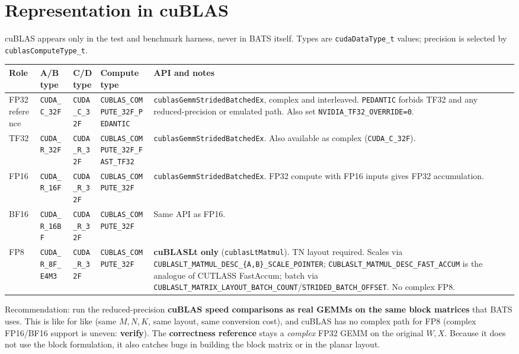 \documentclass[10pt,letterpaper]{article}
\begin{document}
\section{Representation in cuBLAS}

cuBLAS appears only in the test and benchmark harness, never in BATS itself. Types are \texttt{cudaDataType\_t} values; precision is selected by \texttt{cublasComputeType\_t}.

\begin{center}
\small
\begin{tabularx}{\linewidth}{@{}l l l l X@{}}
  \toprule
  \textbf{Role} & \textbf{A/B type} & \textbf{C/D type} & \textbf{Compute type} & \textbf{API and notes} \\
  \midrule
  FP32 reference & \texttt{CUDA\_C\_32F} & \texttt{CUDA\_C\_32F} & \texttt{CUBLAS\_COMPUTE\_32F\_PEDANTIC} & \texttt{cublasGemmStridedBatchedEx}, complex and interleaved. \texttt{PEDANTIC} forbids TF32 and any reduced-precision or emulated path. Also set \texttt{NVIDIA\_TF32\_OVERRIDE=0}. \\
  TF32 & \texttt{CUDA\_R\_32F} & \texttt{CUDA\_R\_32F} & \texttt{CUBLAS\_COMPUTE\_32F\_FAST\_TF32} & \texttt{cublasGemmStridedBatchedEx}. Also available as complex (\texttt{CUDA\_C\_32F}). \\
  FP16 & \texttt{CUDA\_R\_16F} & \texttt{CUDA\_R\_32F} & \texttt{CUBLAS\_COMPUTE\_32F} & \texttt{cublasGemmStridedBatchedEx}. FP32 compute with FP16 inputs gives FP32 accumulation. \\
  BF16 & \texttt{CUDA\_R\_16BF} & \texttt{CUDA\_R\_32F} & \texttt{CUBLAS\_COMPUTE\_32F} & Same API as FP16. \\
  FP8 & \texttt{CUDA\_R\_8F\_E4M3} & \texttt{CUDA\_R\_32F} & \texttt{CUBLAS\_COMPUTE\_32F} & \textbf{cuBLASLt only} (\texttt{cublasLtMatmul}). TN layout required. Scales via \texttt{CUBLASLT\_MATMUL\_DESC\_\{A,B\}\_SCALE\_POINTER}; \texttt{CUBLASLT\_MATMUL\_DESC\_FAST\_ACCUM} is the analogue of CUTLASS FastAccum; batch via \texttt{CUBLASLT\_MATRIX\_LAYOUT\_BATCH\_COUNT}/\texttt{STRIDED\_BATCH\_OFFSET}. No complex FP8. \\
  \bottomrule
\end{tabularx}
\end{center}

Recommendation: run the reduced-precision \textbf{cuBLAS speed comparisons as real GEMMs on the same block matrices} that BATS uses. This is like for like (same $M,N,K$, same layout, same conversion cost), and cuBLAS has no complex path for FP8 (complex FP16/BF16 support is uneven: \textbf{verify}). The \textbf{correctness reference} stays a \emph{complex} FP32 GEMM on the original $W, X$. Because it does not use the block formulation, it also catches bugs in building the block matrix or in the planar layout.
\end{document}
